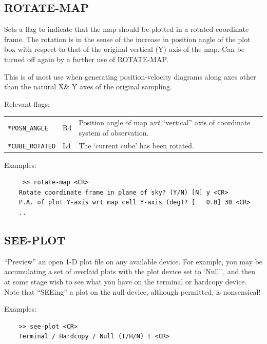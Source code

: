 \documentclass[11pt,twoside]{report}
\begin{document}
\subsection{ROTATE-MAP} 

Sets a flag to indicate that the map should be plotted in a rotated 
coordinate frame. The rotation is in the sense of the increase in
position angle of the plot box with respect to that of the original
vertical (Y) axis of the map. Can be turned off again by a further 
use of ROTATE-MAP.

This is of most use when generating position-velocity diagrams along
axes other than the natural X\& Y axes of the original sampling.

Relevant flags:\\
\begin{tabular}{lll}
  \verb+*POSN_ANGLE+ & R4 & \parbox[t]{4in}
                            {Position angle of map {\em wrt} ``vertical''
                             axis of coordinate system of observation.}\\
  \verb+*CUBE_ROTATED+ & L4 & The `current cube' has been rotated.\\
\end{tabular}

Examples:
\begin{verbatim}
     >> rotate-map <CR>
    Rotate coordinate frame in plane of sky? (Y/N) [N] y <CR>
    P.A. of plot Y-axis wrt map cell Y-axis (deg)? [   0.0] 30 <CR>
    ..
\end{verbatim}

\subsection{SEE-PLOT} 

``Preview'' an open 1-D plot file on any available device. For example,
you may be accumulating a set of overlaid plots with the plot device set 
to `Null'', and then at some stage wish to see  what you have on the 
terminal or hardcopy device. Note that ``SEEing'' a plot on the null device,
although permitted, is nonsensical!

Examples:
\begin{verbatim}
    >> see-plot <CR>
    Terminal / Hardcopy / Null (T/H/N) t <CR>
\end{verbatim}
\end{document}

